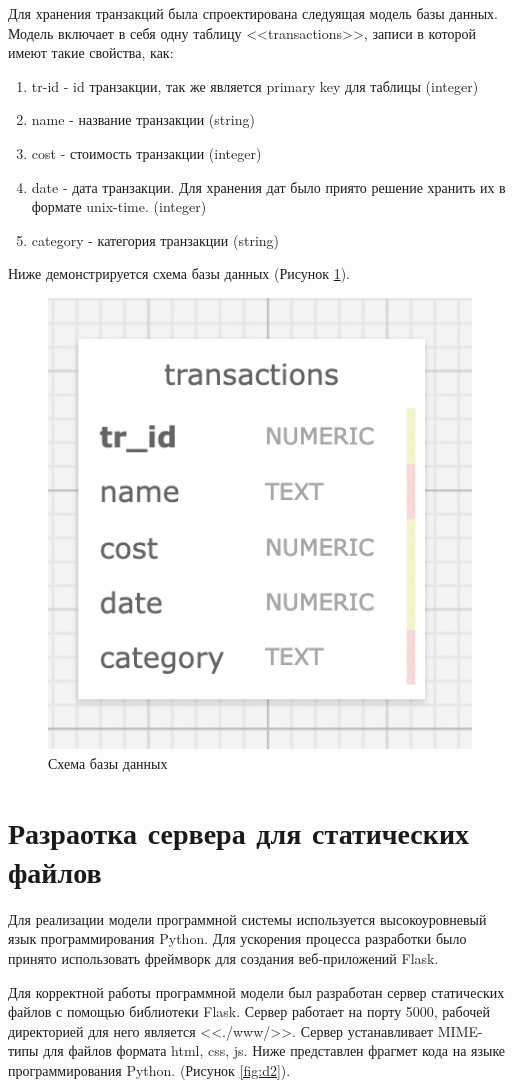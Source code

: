 \documentclass[14pt]{extreport}
\begin{document}
Для хранения транзакций была спроектирована следуящая модель базы данных. Модель включает в себя одну таблицу <<transactions>>, записи в которой имеют такие свойства, как: 
\begin{enumerate}
    \item tr-id - id транзакции, так же является primary key для таблицы (integer)
    \item name - название транзакции (string)
    \item cost - стоимость транзакции (integer)
    \item date - дата транзакции. Для хранения дат было приято решение хранить их в формате unix-time. (integer)
    \item category - категория транзакции (string)
\end{enumerate}

Ниже демонстрируется схема базы данных (Рисунок \ref{fig:d1}). 

\begin{figure}[h]   
    \centering
    \includegraphics[width=0.5\linewidth]{db.png}
    \caption{ Схема базы данных }
    \label{fig:d1}
\end{figure}

\section{Разраотка сервера для статических файлов}

Для реализации модели программной системы используется высокоуровневый язык программирования Python. Для ускорения процесса разработки было принято использовать фреймворк для создания веб-приложений Flask.

Для корректной работы программной модели был разработан сервер статических файлов с помощью библиотеки Flask. Сервер работает на порту 5000, рабочей директорией для него является <<./www/>>. Сервер устанавливает MIME-типы для файлов формата html, css, js. Ниже представлен фрагмет кода на языке программирования Python. (Рисунок \ref{fig:d2}). 
\end{document}
